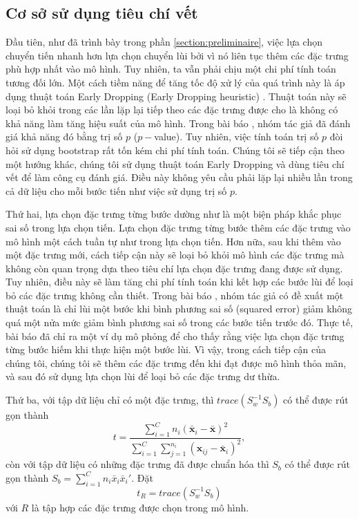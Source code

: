 \subsection{Cơ sở sử dụng tiêu chí vết}
Đầu tiên, như đã trình bày trong phần \ref{section:preliminaire}, việc lựa chọn chuyển tiến nhanh hơn lựa chọn chuyển lùi bởi vì nó liên tục thêm các đặc trưng phù hợp nhất vào mô hình. Tuy nhiên, ta vẫn phải chịu một chi phí tính toán tương đối lớn. Một cách tiềm năng để tăng tốc độ xử lý của quá trình này là áp dụng thuật toán Early Dropping (Early Dropping heuristic) \cite{borboudakis2019forward}. Thuật toán này sẽ loại bỏ khỏi trong các lần lặp lại tiếp theo các đặc trưng được cho là không có khả năng làm tăng hiệu suất của mô hình. Trong bài báo \cite{borboudakis2019forward}, nhóm tác giả đã đánh giá khả năng đó bằng trị số $p$ ($p-$value). Tuy nhiên, việc tính toán trị số $p$ đòi hỏi sử dụng bootstrap rất tốn kém chi phí tính toán. Chúng tôi sẽ tiếp cận theo một hướng khác, chúng tôi sử dụng thuật toán Early Dropping và dùng tiêu chí vết để làm công cụ đánh giá. Điều này không yêu cầu phải lặp lại nhiều lần trong cả dữ liệu cho mỗi bước tiến như việc sử dụng trị số $p$.

Thứ hai, lựa chọn đặc trưng từng bước dường như là một biện pháp khắc phục sai số trong lựa chọn tiến. Lựa chọn đặc trưng từng bước thêm các đặc trưng vào mô hình một cách tuần tự như trong lựa chọn tiến. Hơn nữa, sau khi thêm vào một đặc trưng mới, cách tiếp cận này sẽ loại bỏ khỏi mô hình các đặc trưng mà không còn quan trọng dựa theo tiêu chí lựa chọn đặc trưng đang được sử dụng. Tuy nhiên, điều này sẽ làm tăng chi phí tính toán khi kết hợp các bước lùi để loại bỏ các đặc trưng không cần thiết. Trong bài báo \cite{zhang2011adaptive}, nhóm tác giả có đề xuất một thuật toán là chỉ lùi một bước khi bình phương sai số (squared error) giảm không quá một nửa mức giảm bình phương sai số trong các bước tiến trước đó. Thực tế, bài báo \cite{nguyen2019faster} đã chỉ ra một ví dụ mô phỏng để cho thấy rằng việc lựa chọn đặc trưng từng bước hiếm khi thực hiện một bước lùi. Vì vậy, trong cách tiếp cận của chúng tôi, chúng tôi sẽ thêm các đặc trưng đến khi đạt được mô hình thỏa mãn, và sau đó sử dụng lựa chọn lùi để loại bỏ các đặc trưng dư thừa.

Thứ ba, với tập dữ liệu chỉ có một đặc trưng, thì $trace(S_w^{-1}S_b)$ có thể được rút gọn thành \begin{equation}
	t = \frac{\sum_{i=1}^C n_i(\bar{\boldsymbol{x} }_i-\bar{\boldsymbol{x} })^2}{\sum_{i=1}^C\sum_{j=1}^{n_i}(\boldsymbol{x} _{ij}-\bar{\boldsymbol{x} }_i)^2},
\end{equation} còn với tập dữ liệu có những đặc trưng đã được chuẩn hóa thì $S_b$ có thể được rút gọn thành $S_b = \sum_{i=1}^C n_i \bar{x}_i \bar{x}_i'$. Đặt \begin{equation}
	t_R = trace(S^{-1}_wS_b)
\end{equation} với $R$ là tập hợp các đặc trưng được chọn trong mô hình.

